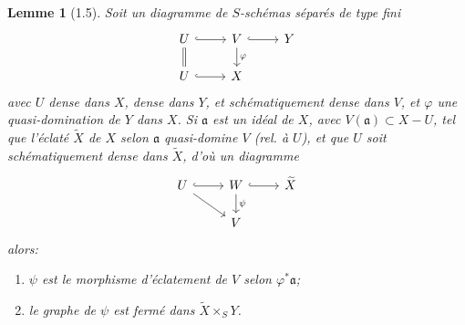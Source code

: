 \documentclass[10pt,a4paper]{article}
\theoremstyle{deligne}
\newtheorem*{lemma*}{Lemme}
\begin{document}
\begin{lemma*}[1.5]
Soit un diagramme de \(S\)-schémas séparés de type fini
\[
\begin{tikzcd}[column sep=2.4em,row sep=1.5em]
U \arrow[r,hook] \arrow[d,equal] & V \arrow[r,hook] \arrow[d,"\varphi"] & Y \\
U \arrow[r,hook] & X
\end{tikzcd}
\]
avec \(U\) dense dans \(X\), dense dans \(Y\), et schématiquement dense dans \(V\), et \(\varphi\) une quasi-domination de \(Y\) dans \(X\). Si \(\mathfrak a\) est un idéal de \(X\), avec \(V(\mathfrak a)\subset X-U\), tel que l'éclaté \(\widetilde X\) de \(X\) selon \(\mathfrak a\) quasi-domine \(V\) (rel. à \(U\)), et que \(U\) soit schématiquement dense dans \(\widetilde X\), d'où un diagramme
\[
\begin{tikzcd}[column sep=2.4em,row sep=1.5em]
U \arrow[r,hook] \arrow[dr] & W \arrow[r,hook] \arrow[d,"\psi"] & \widetilde X \\
& V
\end{tikzcd}
\]
alors:
\begin{enumerate}[label=(\alph*)]
\item \(\psi\) est le morphisme d'éclatement de \(V\) selon \(\varphi^*\mathfrak a\);
\item le graphe de \(\psi\) est fermé dans \(\widetilde X\times_S Y\).
\end{enumerate}
\end{lemma*}
\end{document}
